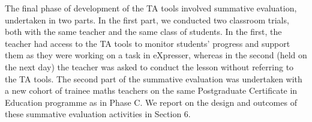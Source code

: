 The final phase of development of the TA tools %
involved summative evaluation, undertaken in two parts. 
In the first part, we conducted two classroom trials, both with the same teacher
and the same class of students. In the first, the teacher had access
to the TA tools to monitor students' progress and support them 
as they were working on a task in eXpresser, whereas in the second  
(held on the next day) the teacher was asked to conduct the lesson without 
referring to the TA tools. 
%
The second part of the summative evaluation was undertaken with a 
new cohort of trainee maths teachers on the same Postgraduate 
Certificate in Education programme as in Phase C.  
We report on the design and outcomes of these summative evaluation
activities in Section 6.

 

